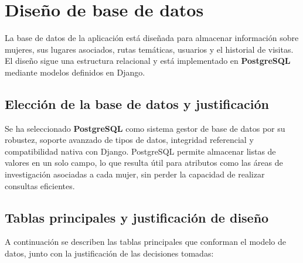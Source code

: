 
\section{Diseño de base de datos}

La base de datos de la aplicación está diseñada para almacenar información sobre mujeres, sus lugares asociados, rutas temáticas, usuarios y el historial de visitas. El diseño sigue una estructura relacional y está implementado en \textbf{PostgreSQL} mediante modelos definidos en Django.

\subsection{Elección de la base de datos y justificación}

Se ha seleccionado \textbf{PostgreSQL} como sistema gestor de base de datos por su robustez, soporte avanzado de tipos de datos, integridad referencial y compatibilidad nativa con Django. PostgreSQL permite almacenar listas de valores en un solo campo, lo que resulta útil para atributos como las áreas de investigación asociadas a cada mujer, sin perder la capacidad de realizar consultas eficientes.

\subsection{Tablas principales y justificación de diseño}

A continuación se describen las tablas principales que conforman el modelo de datos, junto con la justificación de las decisiones tomadas:

